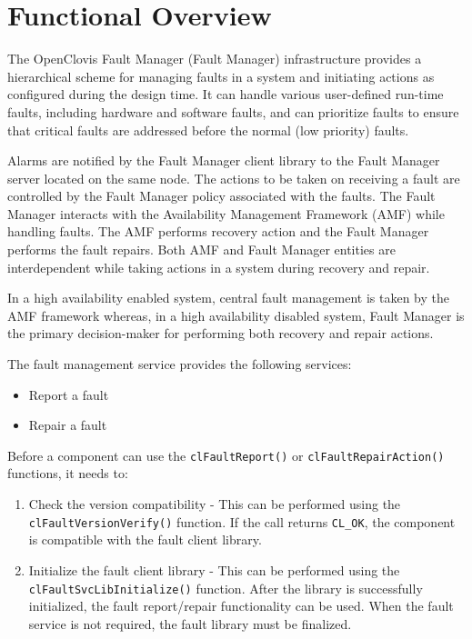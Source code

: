 
\hypertarget{group__group22}{
\chapter{Functional Overview}
\label{group__group21}
}

\begin{flushleft}

The OpenClovis Fault Manager (Fault Manager) infrastructure provides a hierarchical scheme for managing faults in a system and initiating actions 
as configured during the design time. It can handle various user-defined run-time faults, including hardware and software faults, and can prioritize
faults to ensure that critical faults are addressed before the normal (low priority) faults. 
 \par
 Alarms are notified by the Fault Manager client library to the Fault Manager server located on the same node. The actions to be taken on receiving a 
 fault are controlled by the Fault Manager policy associated with the faults.
The Fault Manager interacts with the Availability Management Framework (AMF) while handling faults.
The AMF performs recovery action and the Fault Manager performs the fault repairs. Both AMF and Fault Manager entities are interdependent while taking
actions in a system during recovery and repair. 
 \par
 In a high availability enabled system, central fault management is taken by the AMF framework whereas, in a high availability disabled system, Fault Manager is the 
 primary 
 decision-maker for performing both recovery and repair actions. \par
 The fault management service provides the following services: 
 \begin{itemize}
 \item
 Report a fault 
 \item
 Repair a fault 
 \end{itemize}
  
Before a component can use the {\tt{cl\-Fault\-Report()}} or {\tt{cl\-Fault\-Repair\-Action()}} functions, it needs to:
   \begin{enumerate}
   \item
Check the version compatibility - This can be performed using the {\tt{cl\-Fault\-Version\-Verify()}} function. If the call returns {\tt{CL\_\-OK}},  
the component is compatible with the fault client library.
  \item
  Initialize the fault client library - This can be performed using the {\tt{clFaultSvcLibInitialize()}} function. After the library is successfully
  initialized, the fault report/repair functionality can be used. When the fault service is not required, the fault library must be finalized.
  \end{enumerate}


\end{flushleft}
